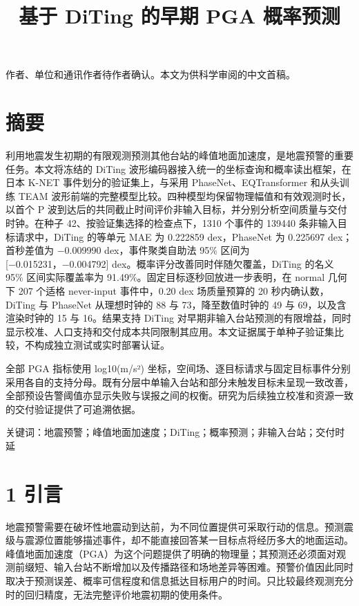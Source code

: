 \documentclass[UTF8,a4paper,11pt]{ctexart}
\begin{document}
\title{基于 DiTing 的早期 PGA 概率预测}\maketitle

作者、单位和通讯作者待作者确认。本文为供科学审阅的中文首稿。

\section*{摘要}

利用地震发生初期的有限观测预测其他台站的峰值地面加速度，是地震预警的重要任务。本文将冻结的 DiTing 波形编码器接入统一的坐标查询和概率读出框架，在日本 K-NET 事件划分的验证集上，与采用 PhaseNet、EQTransformer 和从头训练 TEAM 波形前端的完整模型比较。四种模型均保留物理幅值和有效观测时长，以首个 P 波到达后的共同截止时间评价非输入目标，并分别分析空间质量与交付时钟。在种子 42、按验证集选择的检查点下，1310 个事件的 139440 条非输入目标请求中，DiTing 的等单元 MAE 为 0.222859 dex，PhaseNet 为 0.225697 dex；首秒差值为 −0.009990 dex，事件聚类自助法 95\% 区间为 [−0.015231，−0.004792] dex。概率评分改善同时伴随欠覆盖，DiTing 的名义 95\% 区间实际覆盖率为 91.49\%。固定目标逐秒回放进一步表明，在 normal 几何下 207 个适格 never-input 事件中，0.20 dex 场质量预算的 20 秒内确认数，DiTing 与 PhaseNet 从理想时钟的 88 与 73，降至数值时钟的 49 与 69，以及含渲染时钟的 15 与 16。结果支持 DiTing 对早期非输入台站预测的有限增益，同时显示校准、人口支持和交付成本共同限制其应用。本文证据属于单种子验证集比较，不构成独立测试或实时部署认证。

全部 PGA 指标使用 log10(m/s²) 坐标，空间场、逐目标请求与固定目标事件分别采用各自的支持分母。既有分层中单输入台站和部分未触发目标未呈现一致改善，全部预设告警阈值亦显示失败与误报之间的权衡。研究为后续独立校准和资源一致的交付验证提供了可追溯依据。

关键词：地震预警；峰值地面加速度；DiTing；概率预测；非输入台站；交付时延

\section*{1 引言}

地震预警需要在破坏性地震动到达前，为不同位置提供可采取行动的信息。预测震级与震源位置能够描述事件，却不能直接回答某一目标点将经历多大的地面运动。峰值地面加速度（PGA）为这个问题提供了明确的物理量；其预测还必须面对观测前缀短、输入台站不断增加以及传播路径和场地差异等困难。预警价值因此同时取决于预测误差、概率可信程度和信息抵达目标用户的时间。只比较最终观测充分时的回归精度，无法完整评价地震初期的使用条件。
\end{document}
